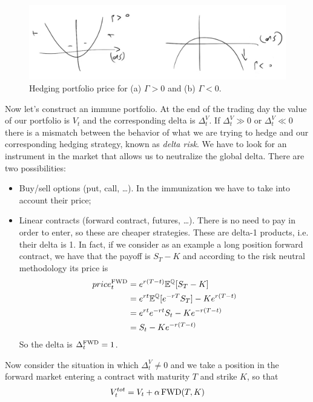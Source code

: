 \begin{figure}[htp]
    \centering
    \includegraphics[scale=0.3]{fig/tmp/fig23.png}
    \caption{Hedging portfolio price for (a) $\Gamma>0$ and (b) $\Gamma<0$.}
    \label{fig:pnl}
\end{figure}
\newline Now let's construct an immune portfolio. At the end of the trading day the value of our portfolio is $V_t$ and the corresponding delta is $\Delta^V_t$. If $\Delta^V_t\gg0$ or $\Delta^V_t\ll0$ there is a mismatch between the behavior of what we are trying to hedge and our corresponding hedging strategy, known as \emph{delta risk}. We have to look for an instrument in the market that allows us to neutralize the global delta. There are two possibilities:
\begin{itemize}
    \item Buy/sell options (put, call, \dots). In the immunization we have to take into account their price;
    \item Linear contracts (forward contract, futures, \dots). There is no need to pay in order to enter, so these are cheaper strategies. These are delta-1 products, i.e. their delta is 1. In fact, if we consider as an example a long position forward contract, we have that the payoff is $S_T-K$ and according to the risk neutral methodology its price is
    \begin{align*}
        price_t^{\operatorname{FWD}} &= e^{r(T-t)}\mathbb{E}^{\mathbb{Q}}[S_T-K]\\
        &=
        e^{rt}\mathbb{E}^{\mathbb{Q}}[e^{-rT}S_T] - Ke^{r(T-t)} \\
        &=
        e^{rt}e^{-rt}S_t - Ke^{-r(T-t)} \\
        &= 
        S_t - Ke^{-r(T-t)} 
    \end{align*}
    So the delta is $\Delta^{\operatorname{FWD}}_t=1$.
\end{itemize}
Now consider the situation in which $\Delta^V_t\ne0$ and we take a position in the forward market entering a contract with maturity $T$ and strike $K$, so that 
\begin{equation}
    V^{tot}_t = V_t + \alpha\operatorname{FWD}(T,K)
\end{equation}
